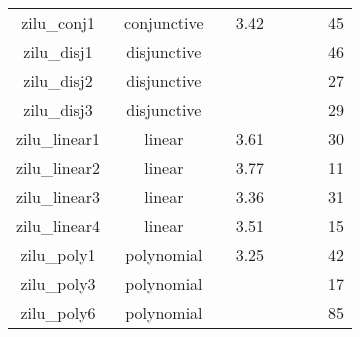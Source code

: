 \begin{table}[t]
\begin{tabular}{| c | c | c | c | c | c | c | c | }
\multicolumn{1}{|c|}{zilu\_conj1~\cite{zilu:repo}}				&conjunctive	& \xmark    &3.42	  & \xmark  & \xmark  & \xmark   & 45\\
\multicolumn{1}{|c|}{zilu\_disj1~\cite{zilu:repo}}				&disjunctive	& \cmark    &\xmark	  & \xmark  & \xmark  & \xmark   & 46\\
\multicolumn{1}{|c|}{zilu\_disj2~\cite{zilu:repo}}				&disjunctive	& \xmark    &\xmark	  & \xmark  & \xmark  & \xmark   & 27\\
\multicolumn{1}{|c|}{zilu\_disj3~\cite{zilu:repo}}				&disjunctive	& \xmark    &\xmark	  & \xmark  & \xmark  & \xmark   & 29\\
\multicolumn{1}{|c|}{zilu\_linear1~\cite{zilu:repo}}			&linear			& \cmark    &3.61	  & \xmark  & \xmark  & \xmark   & 30\\
\multicolumn{1}{|c|}{zilu\_linear2~\cite{zilu:repo}}			&linear			& \cmark    &3.77	  & \xmark  & \xmark  & \xmark   & 11\\
\multicolumn{1}{|c|}{zilu\_linear3~\cite{zilu:repo}}			&linear			& \cmark    &3.36	  & \xmark  & \xmark  & \xmark   & 31\\
\multicolumn{1}{|c|}{zilu\_linear4~\cite{zilu:repo}}			&linear 		& \cmark    &3.51	  & \xmark  & \xmark  & \xmark   & 15\\
\multicolumn{1}{|c|}{zilu\_poly1~\cite{zilu:repo}}				&polynomial		& \xmark    &3.25	  & \xmark  & \xmark  & \xmark   & 42\\
\multicolumn{1}{|c|}{zilu\_poly3~\cite{zilu:repo}}				&polynomial		& \xmark    &\xmark	  & \xmark  & \xmark  & \xmark   & 17\\
\multicolumn{1}{|c|}{zilu\_poly6~\cite{zilu:repo}}				&polynomial		& \xmark    &\xmark	  & \xmark  & \xmark  & \xmark   & 85\\
\hline
\end{tabular}
\label{tbl:stats2}
\end{table}

